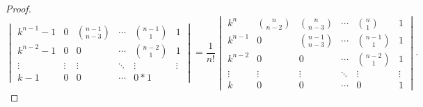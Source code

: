 \documentclass[class=linearalgebra,crop=false]{standalone}
\begin{document}
\begin{proof}
\[\begin{vmatrix}
            k^{n-1} - 1 & 0              & \binom{n-1}{n-3} & \cdots & \binom{n-1}{1} & 1      \\
            k^{n-2} - 1 & 0              & 0                & \cdots & \binom{n-2}{1} & 1      \\
            \vdots      & \vdots         & \vdots           & \ddots & \vdots         & \vdots \\
            k - 1       & 0              & 0                & \cdots & 0              * 1
        \end{vmatrix}
        = \dfrac{1}{n!}
        \begin{vmatrix}
            k^{n}    & \binom{n}{n-2} & \binom{n}{n-3}   & \cdots & \binom{n}{1}   & 1      \\
            k^{n-1}  & 0              & \binom{n-1}{n-3} & \cdots & \binom{n-1}{1} & 1      \\
            k^{n-2}  & 0              & 0                & \cdots & \binom{n-2}{1} & 1      \\
            \vdots   & \vdots         & \vdots           & \ddots & \vdots         & \vdots \\
            k        & 0              & 0                & \cdots & 0              & 1
        \end{vmatrix}.
    \]
\end{proof}
\end{document}
